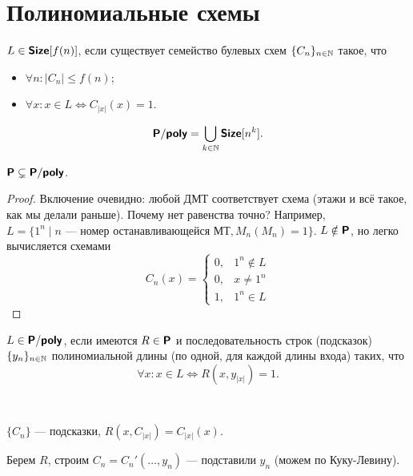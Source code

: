 \section{Полиномиальные схемы}
\begin{defn}[\Size]\index{\Size}
	$ L \in \Size[f(n)]$, если существует семейство булевых схем $ \{C_n\}_{n \in \N}$ такое, что
	\begin{itemize}[noitemsep]
		\item $ \forall n\colon \lvert C_n \rvert \le f(n)$;
		\item $ \forall x \colon x \in L \Longleftrightarrow C_{\lvert x \rvert }(x) = 1$.
	\end{itemize}
\end{defn}
\begin{defn}\index{\Ppoly}
    \[
		\Ppoly = \bigcup_{k \in \N} \Size[n^{k}]
    .\] 
\end{defn}
\begin{st}
    $ \P \subsetneq \Ppoly$.
\end{st}
\begin{proof}
    Включение очевидно: любой ДМТ соответствует схема (этажи и всё такое, как мы делали раньше).
	Почему нет равенства точно? Например, $ L = \{1^{n} \mid n \text{ --- номер останавливающейся МТ}, M_n(M_n) = 1\}$.
	$ L \notin \P$, но легко вычисляется схемами 
	\[
		C_{n}(x) = 
		\begin{cases}
			0, &1^{n} \notin L\\
			0, &x \ne 1^{n}\\
			1, &1^{n} \in L
		\end{cases}
	\] 
\end{proof}
\begin{defn}\index{\Ppoly}
	$ L \in \Ppoly$, если имеются $ R \in \P$ и последовательность строк (подсказок) $ \{y_{n}\}_{n \in \N}$ полиномиальной длины (по одной, для каждой длины входа) таких, что
	\[
		\forall x\colon x \in L \Longleftrightarrow R(x, y_{\lvert x \rvert }) = 1
	.\] 
\end{defn}
\begin{note}
	~\begin{description}[noitemsep]
	    \item {} 
	$ \{C_n\}$ --- подсказки, $ R(x, C_{\lvert x \rvert }) = C_{\lvert x \rvert }(x)$.
	    \item {} 
			Берем $ R$, строим $ C_n = C_n' (\ldots, y_n) $ --- подставили $ y_n$ (можем по Куку-Левину).
	\end{description} 
\end{note}

